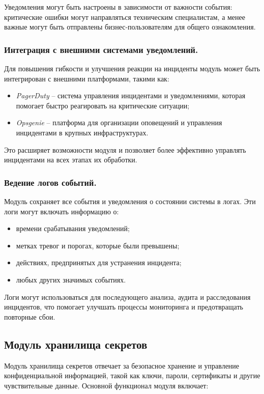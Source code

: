 Уведомления могут быть настроены в зависимости от важности события: критические ошибки могут направляться техническим специалистам, а менее важные могут быть отправлены бизнес-пользователям для общего ознакомления.

\subsubsection{Интеграция с внешними системами уведомлений.} Для повышения гибкости и улучшения реакции на инциденты модуль может быть интегрирован с внешними платформами, такими как:
\begin{itemize}
    \item \textit{PagerDuty} -- система управления инцидентами и уведомлениями, которая помогает быстро реагировать на критические ситуации;
    \item \textit{Opsgenie} -- платформа для организации оповещений и управления инцидентами в крупных инфраструктурах.
\end{itemize}

Это расширяет возможности модуля и позволяет более эффективно управлять инцидентами на всех этапах их обработки.

\subsubsection{Ведение логов событий.} Модуль сохраняет все события и уведомления о состоянии системы в логах. Эти логи могут включать информацию о:
\begin{itemize}
    \item времени срабатывания уведомлений;
    \item метках тревог и порогах, которые были превышены;
    \item действиях, предпринятых для устранения инцидента;
    \item любых других значимых событиях.
\end{itemize}

Логи могут использоваться для последующего анализа, аудита и расследования инцидентов, что помогает улучшать процессы мониторинга и предотвращать повторные сбои.

\subsection{Модуль хранилища секретов}
\label{sec:secrets_storage_functionality}

Модуль хранилища секретов отвечает за безопасное хранение и управление конфиденциальной информацией, такой как ключи, пароли, сертификаты и другие чувствительные данные. Основной функционал модуля включает:

